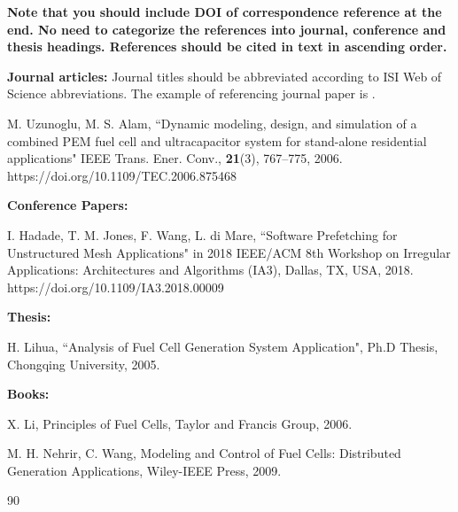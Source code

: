 \documentclass{article} %
\begin{document}
\begin{multicols}{2}
\textbf{Note that you should include DOI of correspondence reference at the end. No need to categorize the references into journal, conference and thesis headings. References should be cited in text in ascending order.}
\newline

\footnotesize{

\noindent \textbf{Journal articles:} Journal titles should be abbreviated according to ISI Web of Science abbreviations. The example of referencing journal paper is \cite{journal1}. 
\begin{thebibliography}{99}
	M. Uzunoglu, M. S. Alam, ``Dynamic modeling, design, and simulation of a combined PEM fuel cell and ultracapacitor system for stand-alone residential applications" IEEE Trans. Ener. Conv., \textbf{21}(3), 767--775, 2006. https://doi.org/10.1109/TEC.2006.875468


\hspace{-1cm} \textbf{Conference Papers:}

I. Hadade, T. M. Jones, F. Wang, L. di Mare, ``Software Prefetching for Unstructured Mesh Applications" in 2018 IEEE/ACM 8th Workshop on Irregular Applications: Architectures and Algorithms (IA3), Dallas, TX, USA, 2018. https://doi.org/10.1109/IA3.2018.00009

\hspace{-1cm} \textbf{Thesis:}

	H. Lihua, ``Analysis of Fuel Cell Generation System Application", Ph.D Thesis, Chongqing University, 2005.

\hspace{-1cm} \textbf{Books:}

	X. Li, Principles of Fuel Cells, Taylor and Francis Group, 2006.

	M. H. Nehrir, C. Wang, Modeling and Control of Fuel Cells: Distributed Generation Applications, Wiley-IEEE Press, 2009.

\end{thebibliography}{90}
\noindent

} 

\end{multicols}
\end{document}
